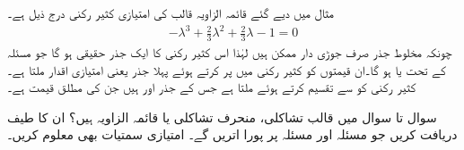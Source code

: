 مثال  میں دیے گئے قائمہ الزاویہ قالب کی امتیازی کثیر رکنی درج ذیل ہے۔
\begin{align*}
-\lambda^3+\frac{2}{3}\lambda^2+\frac{2}{3}\lambda-1=0
\end{align*} 
چونکہ مخلوط جذر صرف جوڑی دار ممکن ہیں لہٰذا اس کثیر رکنی کا ایک جذر حقیقی ہو گا جو مسئلہ  کے تحت  یا  ہو گا۔ان قیمتوں کو کثیر رکنی میں پر کرتے ہوئے پہلا جذر یعنی امتیازی اقدار  ملتا ہے۔کثیر رکنی کو  سے تقسیم کرتے ہوئے  ملتا ہے جس کے جذر   اور  ہیں جن کی مطلق قیمت  ہے۔

سوال  تا سوال  میں قالب تشاکلی، منحرف تشاکلی یا قائمہ الزاویہ ہیں؟ ان کا طیف  دریافت کریں جو مسئلہ  اور مسئلہ  پر پورا اتریں گے۔ امتیازی سمتیات بھی معلوم کریں۔

